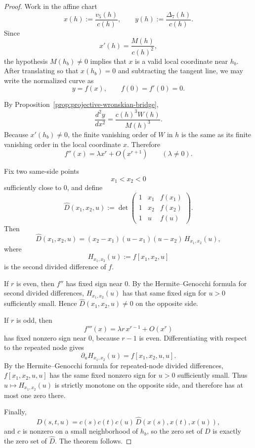 \documentclass[11pt,a4paper]{amsart}
\theoremstyle{plain}
\theoremstyle{definition}
\begin{document}
\begin{proof}
Work in the affine chart
\[
x(h):=\frac{v_5(h)}{c(h)},
\qquad
y(h):=\frac{\Delta_7(h)}{c(h)}.
\]
Since
\[
x'(h)=\frac{M(h)}{c(h)^2},
\]
the hypothesis $M(h_b)\neq 0$ implies that $x$ is a valid local coordinate
near $h_b$. After translating so that $x(h_b)=0$ and subtracting the tangent
line, we may write the normalized curve as
\[
y=f(x),
\qquad
f(0)=f'(0)=0.
\]

By Proposition~\ref{prop:projective-wronskian-bridge},
\[
\frac{d^2y}{dx^2}=\frac{c(h)^3W(h)}{M(h)^3}.
\]
Because $x'(h_b)\neq 0$, the finite vanishing order of $W$ in $h$ is the same
as its finite vanishing order in the local coordinate $x$. Therefore
\[
f''(x)=\lambda x^r+O(x^{r+1})
\qquad(\lambda\neq 0).
\]

Fix two same-side points
\[
x_1<x_2<0
\]
sufficiently close to $0$, and define
\[
\widehat D(x_1,x_2,u):=
\det\!\begin{pmatrix}
1&x_1&f(x_1)\\
1&x_2&f(x_2)\\
1&u&f(u)
\end{pmatrix}.
\]
Then
\[
\widehat D(x_1,x_2,u)
=
(x_2-x_1)(u-x_1)(u-x_2)\,H_{x_1,x_2}(u),
\]
where
\[
H_{x_1,x_2}(u):=f[x_1,x_2,u]
\]
is the second divided difference of $f$.

If $r$ is even, then $f''$ has fixed sign near $0$. By the Hermite--Genocchi
formula for second divided differences, $H_{x_1,x_2}(u)$ has that same fixed
sign for $u>0$ sufficiently small. Hence $\widehat D(x_1,x_2,u)\neq 0$ on the
opposite side.

If $r$ is odd, then
\[
f'''(x)=\lambda r\,x^{r-1}+O(x^r)
\]
has fixed nonzero sign near $0$, because $r-1$ is even. Differentiating with
respect to the repeated node gives
\[
\partial_u H_{x_1,x_2}(u)=f[x_1,x_2,u,u].
\]
By the Hermite--Genocchi formula for repeated-node divided differences,
$f[x_1,x_2,u,u]$ has the same fixed nonzero sign for $u>0$ sufficiently small.
Thus $u\mapsto H_{x_1,x_2}(u)$ is strictly monotone on the opposite side, and
therefore has at most one zero there.

Finally,
\[
D(s,t,u)=c(s)c(t)c(u)\,\widehat D(x(s),x(t),x(u)),
\]
and $c$ is nonzero on a small neighborhood of $h_b$, so the zero set of $D$
is exactly the zero set of $\widehat D$. The theorem follows.
\end{proof}
\end{document}
